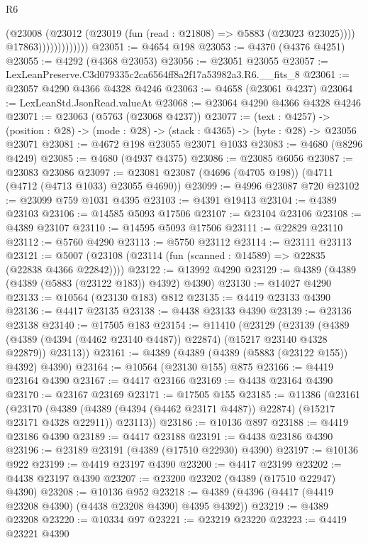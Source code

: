 \begin{lexlean}{R6}
\begin{coremodule}
                            (@23008
                              (@23012 (@23019 (fun (read : @21808) => @5883 (@23023 @23025))))
                              @17863)))))))))))))
@23051 := @4654 @198
@23053 := @4370 (@4376 @4251)
@23055 := @4292 (@4368 @23053)
@23056 := @23051 @23055
@23057 := LexLeanPreserve.C3d079335c2ca6564ff8a2f17a53982a3.R6.__fits_8
@23061 := @23057 @4290 @4366 @4328 @4246
@23063 := @4658 (@23061 @4237)
@23064 := LexLeanStd.JsonRead.valueAt
@23068 := @23064 @4290 @4366 @4328 @4246
@23071 := @23063 (@5763 (@23068 @4237))
@23077 := (text : @4257) ->
  (position : @28) -> (mode : @28) -> (stack : @4365) -> (byte : @28) -> @23056 @23071
@23081 := @4672 @198 @23055 @23071 @1033
@23083 := @4680 (@8296 @4249)
@23085 := @4680 (@4937 @4375)
@23086 := @23085 @6056
@23087 := @23083 @23086
@23097 := @23081 @23087 (@4696 (@4705 @198)) (@4711 (@4712 (@4713 @1033) @23055 @4690))
@23099 := @4996 @23087 @720
@23102 := @23099 @759 @1031 @4395
@23103 := @4391 @19413
@23104 := @4389 @23103
@23106 := @14585 @5093 @17506
@23107 := @23104 @23106
@23108 := @4389 @23107
@23110 := @14595 @5093 @17506
@23111 := @22829 @23110
@23112 := @5760 @4290
@23113 := @5750 @23112
@23114 := @23111 @23113
@23121 := @5007 (@23108 (@23114 (fun (scanned : @14589) => @22835 (@22838 @4366 @22842))))
@23122 := @13992 @4290
@23129 := @4389 (@4389 (@4389 (@5883 (@23122 @183)) @4392) @4390)
@23130 := @14027 @4290
@23133 := @10564 (@23130 @183) @812
@23135 := @4419 @23133 @4390
@23136 := @4417 @23135
@23138 := @4438 @23133 @4390
@23139 := @23136 @23138
@23140 := @17505 @183
@23154 := @11410
    (@23129
      (@23139
        (@4389 (@4389 (@4394 (@4462 @23140 @4487)) @22874) (@15217 @23140 @4328 @22879))
        @23113))
@23161 := @4389 (@4389 (@4389 (@5883 (@23122 @155)) @4392) @4390)
@23164 := @10564 (@23130 @155) @875
@23166 := @4419 @23164 @4390
@23167 := @4417 @23166
@23169 := @4438 @23164 @4390
@23170 := @23167 @23169
@23171 := @17505 @155
@23185 := @11386
    (@23161
      (@23170
        (@4389 (@4389 (@4394 (@4462 @23171 @4487)) @22874) (@15217 @23171 @4328 @22911))
        @23113))
@23186 := @10136 @897
@23188 := @4419 @23186 @4390
@23189 := @4417 @23188
@23191 := @4438 @23186 @4390
@23196 := @23189 @23191 (@4389 (@17510 @22930) @4390)
@23197 := @10136 @922
@23199 := @4419 @23197 @4390
@23200 := @4417 @23199
@23202 := @4438 @23197 @4390
@23207 := @23200 @23202 (@4389 (@17510 @22947) @4390)
@23208 := @10136 @952
@23218 := @4389 (@4396 (@4417 (@4419 @23208 @4390) (@4438 @23208 @4390) @4395 @4392))
@23219 := @4389 @23208
@23220 := @10334 @97
@23221 := @23219 @23220
@23223 := @4419 @23221 @4390

\end{coremodule}
\end{lexlean}
